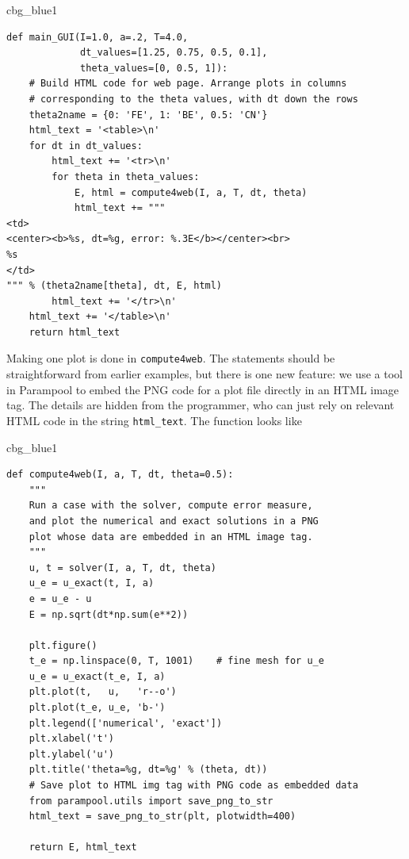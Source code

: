 \documentclass[%
oneside,                 %
final,                   %
10pt]{article}
\newenvironment{_cod_tight}[1]{
   \def\FrameCommand{\colorbox{#1}}
   \FrameRule0.6pt\MakeFramed {\FrameRestore}\vskip3mm}
   {\vskip0mm\endMakeFramed}
\newenvironment{cod}[1]{
\bgroup\rmfamily
\fboxsep=0mm\relax
\begin{_cod_tight}{#1}
\list{}{\parsep=-2mm\parskip=0mm\topsep=0pt\leftmargin=2mm
\rightmargin=2\leftmargin\leftmargin=4pt\relax}
\item\relax}
{\endlist\end{_cod_tight}\egroup}
\begin{document}
\begin{cod}{cbg_blue1}\begin{Verbatim}[numbers=none,fontsize=\fontsize{9pt}{9pt},baselinestretch=0.95,xleftmargin=2mm]
def main_GUI(I=1.0, a=.2, T=4.0,
             dt_values=[1.25, 0.75, 0.5, 0.1],
             theta_values=[0, 0.5, 1]):
    # Build HTML code for web page. Arrange plots in columns
    # corresponding to the theta values, with dt down the rows
    theta2name = {0: 'FE', 1: 'BE', 0.5: 'CN'}
    html_text = '<table>\n'
    for dt in dt_values:
        html_text += '<tr>\n'
        for theta in theta_values:
            E, html = compute4web(I, a, T, dt, theta)
            html_text += """
<td>
<center><b>%s, dt=%g, error: %.3E</b></center><br>
%s
</td>
""" % (theta2name[theta], dt, E, html)
        html_text += '</tr>\n'
    html_text += '</table>\n'
    return html_text
\end{Verbatim}
\end{cod}
\noindent

Making one plot is done in \texttt{compute4web}. The statements should be
straightforward from earlier examples, but there is one new feature:
we use a tool in Parampool to embed the PNG code for a plot file
directly in an HTML image tag. The details are hidden from the
programmer, who can just rely on
relevant HTML code in the string \Verb!html_text!. The function looks like

\begin{cod}{cbg_blue1}\begin{Verbatim}[numbers=none,fontsize=\fontsize{9pt}{9pt},baselinestretch=0.95,xleftmargin=2mm]
def compute4web(I, a, T, dt, theta=0.5):
    """
    Run a case with the solver, compute error measure,
    and plot the numerical and exact solutions in a PNG
    plot whose data are embedded in an HTML image tag.
    """
    u, t = solver(I, a, T, dt, theta)
    u_e = u_exact(t, I, a)
    e = u_e - u
    E = np.sqrt(dt*np.sum(e**2))

    plt.figure()
    t_e = np.linspace(0, T, 1001)    # fine mesh for u_e
    u_e = u_exact(t_e, I, a)
    plt.plot(t,   u,   'r--o')
    plt.plot(t_e, u_e, 'b-')
    plt.legend(['numerical', 'exact'])
    plt.xlabel('t')
    plt.ylabel('u')
    plt.title('theta=%g, dt=%g' % (theta, dt))
    # Save plot to HTML img tag with PNG code as embedded data
    from parampool.utils import save_png_to_str
    html_text = save_png_to_str(plt, plotwidth=400)

    return E, html_text
\end{Verbatim}
\end{cod}
\noindent
\end{document}
